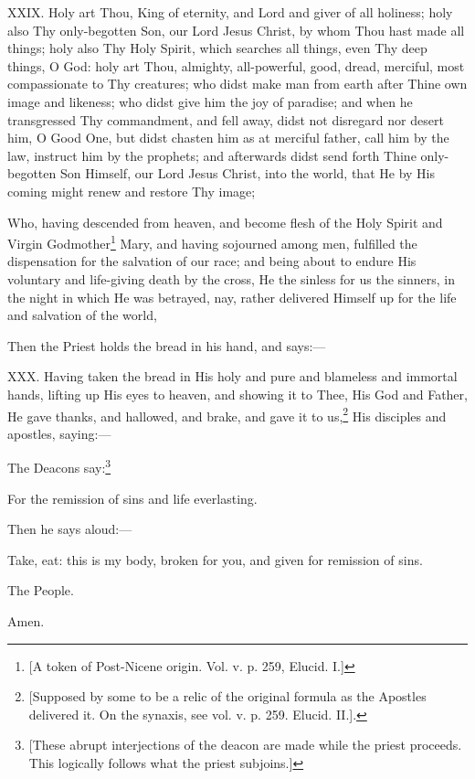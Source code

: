 XXIX. Holy art Thou, King of eternity, and Lord and giver of all holiness; holy also Thy only-begotten Son, our Lord Jesus Christ, by whom Thou hast made all things; holy also Thy Holy Spirit, which searches all things, even Thy deep things, O God: holy art Thou, almighty, all-powerful, good, dread, merciful, most compassionate to Thy creatures; who didst make man from earth after Thine own image and likeness; who didst give him the joy of paradise; and when he transgressed Thy commandment, and fell away, didst not disregard nor desert him, O Good One, but didst chasten him as at merciful father, call him by the law, instruct him by the prophets; and afterwards didst send forth Thine only-begotten Son Himself, our Lord Jesus Christ, into the world, that He by His coming might renew and restore Thy image;

Who, having descended from heaven, and become flesh of the Holy Spirit and Virgin Godmother\footnote{\par{}  [A token of Post-Nicene origin. Vol. v. p. 259, Elucid. I.]} Mary, and having sojourned among men, fulfilled the dispensation for the salvation of our race; and being about to endure His voluntary and life-giving death by the cross, He the sinless for us the sinners, in the night in which He was betrayed, nay, rather delivered Himself up for the life and salvation of the world,

Then the Priest holds the bread in his hand, and says:—

XXX. Having taken the bread in His holy and pure and blameless and immortal hands, lifting up His eyes to heaven, and showing it to Thee, His God and Father, He gave thanks, and hallowed, and brake, and gave it to us,\footnote{\par{}  [Supposed by some to be a relic of the original formula as the Apostles delivered it. On the synaxis, see vol. v. p. 259. Elucid. II.].} His disciples and apostles, saying:—

The Deacons say:\footnote{\par{}  [These abrupt interjections of the deacon are made while the priest proceeds. This logically follows what the priest subjoins.]}

For the remission of sins and life everlasting.

Then he says aloud:—

Take, eat: this is my body, broken for you, and given for remission of sins.

The People.

Amen.

